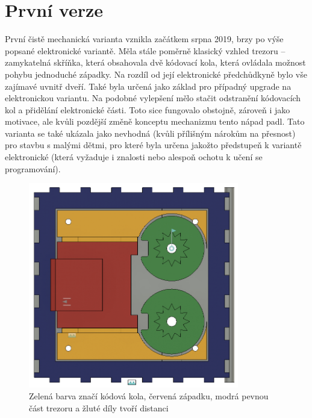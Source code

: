\section{První verze}

První čistě mechanická varianta vznikla začátkem srpna 2019, brzy po výše popsané elektronické variantě.
Měla stále poměrně klasický vzhled trezoru -- zamykatelná skříňka, která obsahovala dvě kódovací kola, která ovládala možnost pohybu jednoduché západky. %
Na rozdíl od její elektronické před\-chůd\-ky\-ně bylo vše zajímavé uvnitř dveří. Také byla určená jako základ pro případný upgrade na elektronickou
variantu. Na podobné vylepšení mělo stačit odstranění kódovacích kol a přidělání elektronické části. Toto sice fungovalo obstojně, zároveň 
i jako motivace, ale kvůli pozdější změně konceptu mechanizmu tento nápad padl.
Tato varianta se také ukázala jako nevhodná (kvůli přílišným nárokům na přesnost) pro stavbu s malými dětmi, pro které byla určena jakožto předstupeň 
k variantě elektronické (která vyžaduje i znalosti nebo alespoň ochotu k učení se programování).

\begin{figure}[htbp]
    \centering
    \includegraphics[width=260pt]{kapitoly/obrazky/M1/mechanizmus.png}
    \caption{Zelená barva značí kódová kola, červená západku, modrá pevnou část trezoru a žluté díly tvoří distanci}
    \label{fig:M1-mechanizmus}
\end{figure}
\newpage